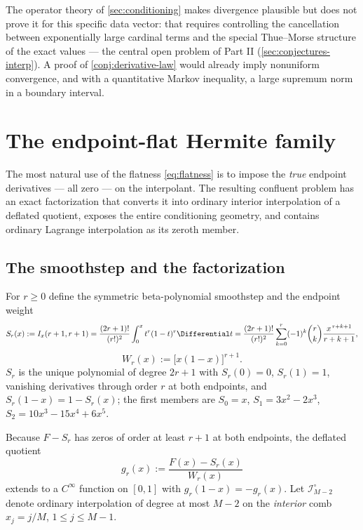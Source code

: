 \documentclass[11pt,oneside]{article}
\numberwithin{equation}{section}
\theoremstyle{definition}
\theoremstyle{remark}
\newcommand{\Lag}{\mathcal I}
\begin{document}
The operator theory of \cref{sec:conditioning} makes divergence
plausible but does not prove it for this specific data vector: that
requires controlling the cancellation between exponentially large
cardinal terms and the special Thue--Morse structure of the exact
values --- the central open problem of Part II
(\cref{sec:conjectures-interp}).  A proof of
\cref{conj:derivative-law} would already imply nonuniform convergence,
and with a quantitative Markov inequality, a large supremum norm in a
boundary interval.

\section{The endpoint-flat Hermite family}
\label{sec:endpoint-flat}

The most natural use of the flatness \eqref{eq:flatness} is to impose
the \emph{true} endpoint derivatives --- all zero --- on the
interpolant.  The resulting confluent problem has an exact
factorization that converts it into ordinary interior interpolation of
a deflated quotient, exposes the entire conditioning geometry, and
contains ordinary Lagrange interpolation as its zeroth member.

\subsection{The smoothstep and the factorization}

For $r\ge0$ define the symmetric beta-polynomial smoothstep and the
endpoint weight
\begin{equation}
 S_r(x):=I_x(r+1,r+1)
 =\frac{(2r+1)!}{(r!)^{2}}\int_0^{x}t^{r}(1-t)^{r}\Differential t
 =\frac{(2r+1)!}{(r!)^{2}}
 \sum_{k=0}^{r}(-1)^{k}\binom rk\frac{x^{\,r+k+1}}{r+k+1},
 \label{eq:smoothstep}
\end{equation}
\begin{equation}
 W_r(x):=\bigl[x(1-x)\bigr]^{r+1}.
 \label{eq:Wr}
\end{equation}
$S_r$ is the unique polynomial of degree $2r+1$ with
$S_r(0)=0$, $S_r(1)=1$, vanishing derivatives through order $r$ at
both endpoints, and $S_r(1-x)=1-S_r(x)$; the first members are
$S_0=x$, $S_1=3x^2-2x^3$, $S_2=10x^3-15x^4+6x^5$.

Because $F-S_r$ has zeros of order at least $r+1$ at both endpoints,
the deflated quotient
\begin{equation}
 g_r(x):=\frac{F(x)-S_r(x)}{W_r(x)}
 \label{eq:def-g}
\end{equation}
extends to a $C^\infty$ function on $[0,1]$ with
$g_r(1-x)=-g_r(x)$.  Let $\Lag^{\circ}_{M-2}$ denote ordinary
interpolation of degree at most $M-2$ on the \emph{interior} comb
$x_j=j/M$, $1\le j\le M-1$.
\end{document}
